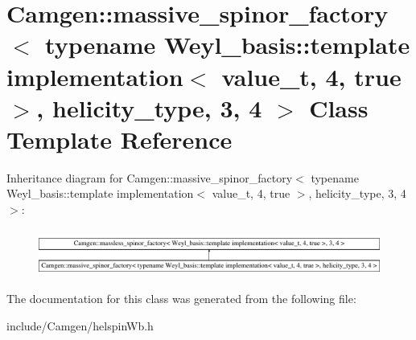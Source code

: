 \hypertarget{a00352}{}\section{Camgen\+:\+:massive\+\_\+spinor\+\_\+factory$<$ typename Weyl\+\_\+basis\+:\+:template implementation$<$ value\+\_\+t, 4, true $>$, helicity\+\_\+type, 3, 4 $>$ Class Template Reference}
\label{a00352}
Inheritance diagram for Camgen\+:\+:massive\+\_\+spinor\+\_\+factory$<$ typename Weyl\+\_\+basis\+:\+:template implementation$<$ value\+\_\+t, 4, true $>$, helicity\+\_\+type, 3, 4 $>$\+:\begin{figure}[H]
\begin{center}
\leavevmode
\includegraphics[height=1.564246cm]{a00352}
\end{center}
\end{figure}


The documentation for this class was generated from the following file\+:\begin{DoxyCompactItemize}
\item 
include/\+Camgen/helspin\+Wb.\+h\end{DoxyCompactItemize}
